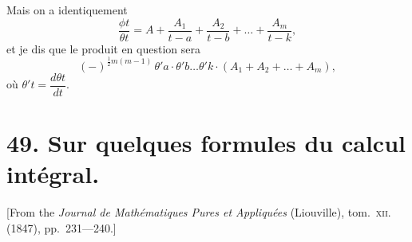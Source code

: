\documentclass[11pt,a4paper]{book}
\begin{document}
Mais on a identiquement
\[
\frac{\phi t}{\theta t} = A + \frac{A_1}{t-a} + \frac{A_2}{t-b} + \ldots + \frac{A_m}{t-k},
\]
et je dis que le produit en question sera
\[
(-)^{\frac{1}{2}m(m-1)}\,\theta' a \cdot \theta' b \ldots \theta' k \cdot (A_1 + A_2 + \ldots + A_m),
\]
où $\theta' t = \dfrac{d\theta t}{dt}$.

\newpage


\section*{49. Sur quelques formules du calcul int\'egral.}

[From the \textit{Journal de Math\'ematiques Pures et Appliqu\'ees} (Liouville), tom.~\textsc{xii}. (1847), pp.~231---240.]

\bigskip
\end{document}
